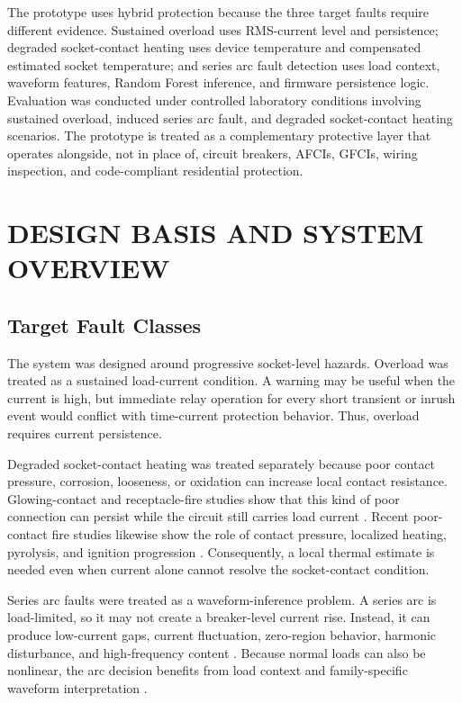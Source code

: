 \documentclass[conference,a4paper]{template/IEEEtran}
\begin{document}
The prototype uses hybrid protection because the three target faults require
different evidence. Sustained overload uses RMS-current level and persistence;
degraded socket-contact heating uses device temperature and compensated
estimated socket temperature; and series arc fault detection uses load
context, waveform features, Random Forest inference, and firmware persistence
logic. Evaluation was conducted under controlled laboratory conditions
involving sustained overload, induced series arc fault, and degraded
socket-contact heating scenarios. The prototype is treated as a
complementary protective layer that operates alongside, not in place of,
circuit breakers, AFCIs, GFCIs, wiring inspection, and code-compliant
residential protection.

\section{DESIGN BASIS AND SYSTEM OVERVIEW}

\subsection{Target Fault Classes}

The system was designed around progressive socket-level hazards. Overload
was treated as a sustained load-current condition. A warning may be
useful when the current is high, but immediate relay operation for every
short transient or inrush event would conflict with time-current
protection behavior. Thus, overload requires current persistence.

Degraded socket-contact heating was treated separately because poor
contact pressure, corrosion, looseness, or oxidation can increase local
contact resistance. Glowing-contact and receptacle-fire studies show that
this kind of poor connection can persist while the circuit still carries
load current \cite{meese-glowing,benfer-receptacle}. Recent poor-contact
fire studies likewise show the role of contact pressure, localized
heating, pyrolysis, and ignition progression \cite{zhang-poor-contact,li-ignition}.
Consequently, a local thermal estimate is needed even when current alone
cannot resolve the socket-contact condition.

Series arc faults were treated as a waveform-inference problem. A series
arc is load-limited, so it may not create a breaker-level current rise.
Instead, it can produce low-current gaps, current fluctuation, zero-region
behavior, harmonic disturbance, and high-frequency content
\cite{lee-afci,tian-arc-ai,zhao-zero,reji-thd,kim-hf}. Because normal
loads can also be nonlinear, the arc decision benefits from load context
and family-specific waveform interpretation \cite{medico-loads,shareef-nilm}.
\end{document}
